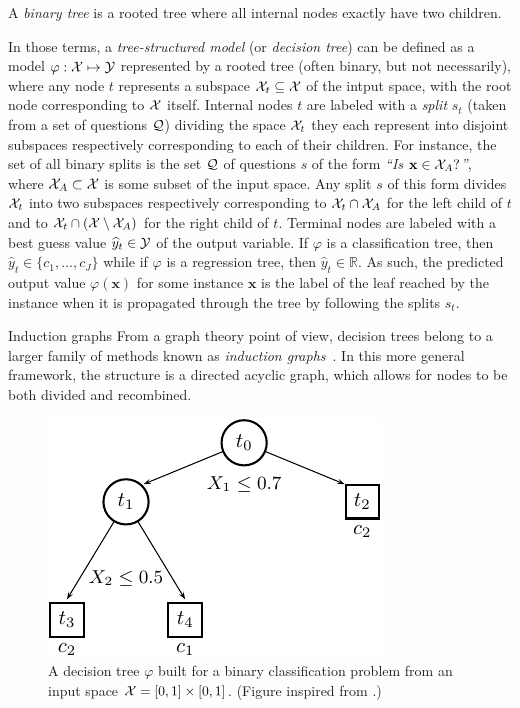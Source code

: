 \begin{definition}
A \emph{binary tree} is a rooted tree where all internal nodes exactly
have two children.
\end{definition}

In those terms, a \textit{tree-structured model} (or \textit{decision tree})
can be defined as a model $\varphi: {\cal X} \mapsto {\cal Y}$ represented by a
rooted tree (often binary, but not necessarily), where any node $t$ represents
a subspace ${\cal X}_t \subseteq {\cal X}$ of the intput space, with the root
node corresponding to ${\cal X}$ itself. Internal nodes $t$ are labeled with a
\textit{split} $s_t$ (taken from a set of questions ${\cal Q}$) dividing the
space ${\cal X}_t$ they each represent into disjoint subspaces respectively
corresponding to each of their children. For instance, the set of all binary
splits is the set ${\cal Q}$ of questions $s$ of the form \textit{``Is
$\mathbf{x} \in {\cal X}_A?$''}, where ${\cal X}_A \subset {\cal X}$ is some
subset of the input space. Any split $s$ of this form divides ${\cal X}_t$ into
two subspaces respectively corresponding to ${\cal X}_t \cap {\cal X}_A$ for
the left child of $t$ and to ${\cal X}_t \cap ({\cal X}\setminus{\cal X}_A)$
for the right child of $t$. Terminal nodes are labeled with a best guess value
$\widehat{y}_t \in {\cal Y}$ of the output variable. If $\varphi$ is a
classification tree, then $\widehat{y}_t \in \{ c_1, ..., c_J \}$ while if
$\varphi$ is a regression tree, then $\widehat{y}_t \in \mathbb{R}$. As such,
the predicted output value $\varphi(\mathbf{x})$ for some instance $\mathbf{x}$
is the label of the leaf reached by the instance when it is propagated through
the tree by following the splits $s_t$.

\begin{remark}{Induction graphs}
From a graph theory point of view, decision trees belong to a larger family
of methods known as \textit{induction graphs}~\citep{zighed:2000}. In this more
general framework, the structure is a directed acyclic graph, which allows for
nodes to be both divided and recombined.
\end{remark}

\begin{figure}
    \centering
    \includegraphics[scale=1.0]{figures/ch3_tree.pdf}
    \caption{A decision tree $\varphi$ built for a binary classification
             problem from an input space ${\cal X}=[0,1]\times[0,1]$.
             (Figure inspired from \citet{breiman:1984}.)}
    \label{fig:3:tree}
\end{figure}


